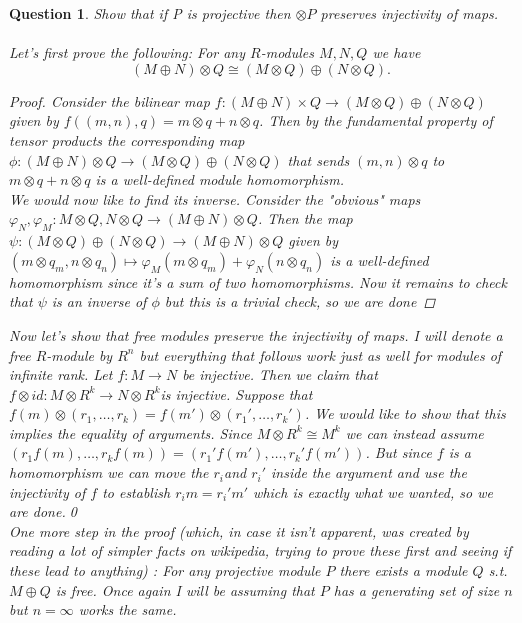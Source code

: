 \documentclass[a4paper]{article}
\newtheorem{que}[thm]{Question}
\begin{document}
\begin{que} Show that if P is projective then $\otimes P$ preserves injectivity of maps.\\ \\
    Let's first prove the following: For any $R$-modules $M,N,Q$ we have  \[
        \left( M \oplus N \right)\otimes Q \cong \left( M\otimes Q \right) \oplus \left( N\otimes Q \right) 
    .\] 
    \begin{proof}
        Consider the bilinear map $f:\left( M\oplus N \right) \times Q\to \left( M\otimes Q \right) \oplus \left( N\otimes Q\right) $ given by $f\left( \left( m,n \right), q \right)=m\otimes q+n\otimes q $. Then by the fundamental property of tensor products the corresponding map $\phi:\left( M\oplus N \right) \otimes Q\to \left( M\otimes Q \right) \oplus \left( N\otimes Q  \right) $ that sends $\left( m,n \right) \otimes q$ to $m\otimes q+n\otimes q$ is a well-defined module homomorphism.\\
        We would now like to find its inverse. Consider the "obvious" maps $\varphi_N,\varphi_M:M\otimes Q,N\otimes Q\to \left( M\oplus N \right) \otimes Q$. Then the map $\psi:\left( M\otimes Q \right) \oplus \left( N\otimes Q \right)\to \left( M\oplus N \right) \otimes Q $ given by $\left( m\otimes q_m,n\otimes q_n \right)\mapsto \varphi_M(m\otimes q_m)+\varphi_N\left( n\otimes q_n \right)$ is a well-defined homomorphism since it's a sum of two homomorphisms. Now it remains to check that $\psi$ is an inverse of $\phi$ but this is a trivial check, so we are done
    \end{proof}
    Now let's show that free modules preserve the injectivity of maps. I will denote a free $R$-module by $R^{n}$ but everything that follows work just as well for modules of infinite rank. Let $f:M\to N$ be injective. Then we claim that $f\otimes id:M\otimes R^{k}\to N\otimes R^{k}$is injective. Suppose that $f\left( m\right)\otimes \left( r_1, \ldots, r_k \right)=f\left( m'\right)\otimes \left( r_1', \ldots,r_k' \right) $. We would like to show that this implies the equality of arguments. Since $M\otimes R^{k}\cong M^{k}$ we can instead assume $\left( r_1f(m), \ldots, r_kf(m) \right) = \left( r_1'f(m'), \ldots ,r_k'f(m') \right) $. But since $f$ is a homomorphism we can move the $r_i$and  $r_i'$ inside the argument and use the injectivity of $f$ to establish $r_im=r_i'm'$ which is exactly what we wanted, so we are done.\qed\\
    One more step in the proof (which, in case it isn't apparent, was created by reading a lot of simpler facts on wikipedia, trying to prove these first and seeing if these lead to anything) : For any projective module $P$ there exists a module $Q$ s.t. $M\oplus Q$ is free. Once again I will be assuming that $P$ has a generating set of size $n$ but $n=\infty$ works the same.\\

\end{que}
\end{document}
